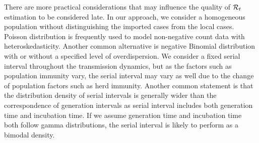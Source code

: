 


There are more practical considerations that may influence the quality of $\mathcal{R}_t$ estimation to be considered late. 
In our approach, we consider a homogeneous population without distinguishing the imported cases from the local cases. 
Poisson distribution is frequently used to model non-negative count data with heteroskedasticity. Another common alternative is negative Binomial distribution with or without a specified level of overdispersion. 
% 
We consider a fixed serial interval throughout the transmission dynamics, but as the factors such as population immunity vary, the serial interval may vary as well due to the change of population factors such as herd immunity. %
Another common statement is that the distribution density of serial intervals is generally wider than the correspondence of generation intervals as serial interval includes both generation time and incubation time. If we assume generation time and incubation time both follow gamma distributions, the serial interval is likely to perform as a bimodal density. 

